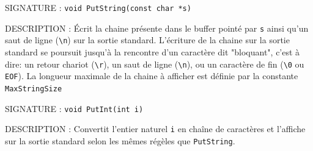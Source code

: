 \documentclass{article}
\begin{document}
		\vspace{3mm}
		\begin{description}
			\item{SIGNATURE : } \texttt{void PutString(const char *s)}
			\item{DESCRIPTION : } Écrit la chaine présente dans le buffer pointé par \texttt{s} ainsi qu'un saut de ligne (\texttt{\textbackslash{}n}) sur la sortie standard. L'écriture de la chaine sur la sortie standard se poursuit jusqu'à la rencontre d'un caractère dit "bloquant", c'est à dire: un retour chariot (\texttt{\textbackslash{}r}), un saut de ligne (\texttt{\textbackslash{}n}), ou un caractère de fin (\texttt{\textbackslash{}0} ou \texttt{EOF}). La longueur maximale de la chaine à afficher est définie par la constante \texttt{MaxStringSize}
		\end{description}
		\vspace{2.5mm}
		\begin{description}
			\item{SIGNATURE : } \texttt{void PutInt(int i)}
			\item{DESCRIPTION : } Convertit l'entier naturel \texttt{i} en chaîne de caractères et l'affiche sur la sortie standard selon les mêmes régèles que \texttt{PutString}.
		\end{description}
\end{document}
